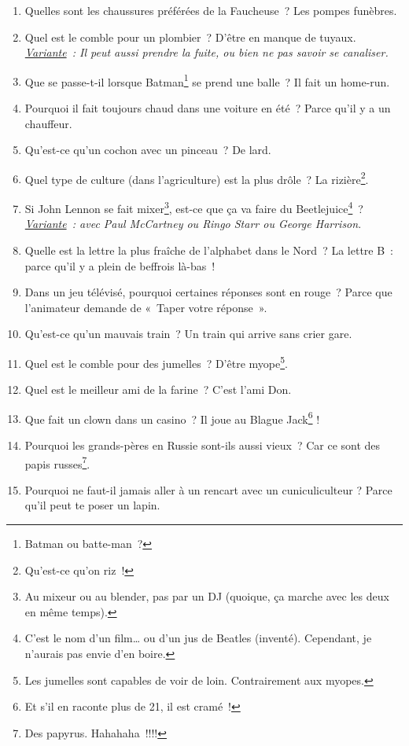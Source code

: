 \documentclass[10pt,a5paper,fullpage]{book}
\begin{document}
\begin{enumerate}
		\item Quelles sont les chaussures préférées de la Faucheuse~? Les pompes funèbres.
		\item Quel est le comble pour un plombier~? D’être en manque de tuyaux. \\\textit{\underline{Variante}~: Il peut aussi prendre la fuite, ou bien ne pas savoir se canaliser.}
		\item Que se passe-t-il lorsque Batman\footnote{Batman ou batte-man~?} se prend une balle~? Il fait un home-run.
		\item Pourquoi il fait toujours chaud dans une voiture en été~? Parce qu’il y a un chauffeur.
		\item Qu’est-ce qu’un cochon avec un pinceau~? De lard.
		\item Quel type de culture (dans l’agriculture) est la plus drôle~? La rizière\footnote{Qu’est-ce qu’on riz~!}.
		\item Si John Lennon se fait mixer\footnote{Au mixeur ou au blender, pas par un DJ (quoique, ça marche avec les deux en même temps).}, est-ce que ça va faire du Beetlejuice\footnote{C’est le nom d’un film… ou d’un jus de Beatles (inventé). Cependant, je n'aurais pas envie d'en boire.}~? \\\textit{\underline{Variante}~: avec Paul McCartney ou Ringo Starr ou George Harrison}.
		\item Quelle est la lettre la plus fraîche de l’alphabet dans le Nord~? La lettre B~: parce qu’il y a plein de beffrois là-bas~!
		\item Dans un jeu télévisé, pourquoi certaines réponses sont en rouge~? Parce que l’animateur demande de «~Taper votre réponse~».
		\item Qu’est-ce qu’un mauvais train~?  Un train qui arrive sans crier gare.
		\item Quel est le comble pour des jumelles~? D’être myope\footnote{Les jumelles sont capables de voir de loin. Contrairement aux myopes.}.
		\item Quel est le meilleur ami de la farine~? C’est l’ami Don.
		\item Que fait un clown dans un casino~? Il joue au Blague Jack\footnote{Et s’il en raconte plus de 21, il est cramé~!} !
		\item Pourquoi les grands-pères en Russie sont-ils aussi vieux~? Car ce sont des papis russes\footnote{Des papyrus. Hahahaha~!!!!}.
		\item Pourquoi ne faut-il jamais aller à un rencart avec un cuniculiculteur ? Parce qu'il peut te poser un lapin. 

\end{enumerate}
\end{document}
